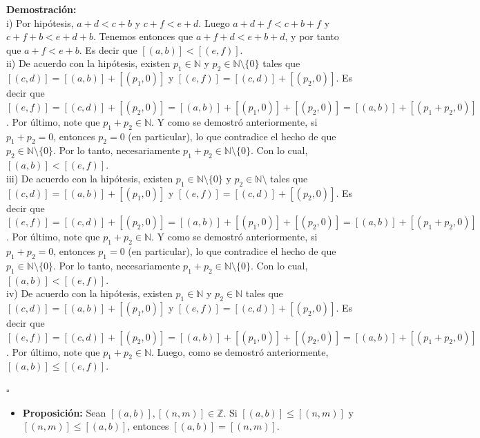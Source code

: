 \documentclass[10 pt]{article}
\begin{document}
\Large{\textbf{Demostración:} \\

i) Por hipótesis, $a+d<c+b$ y $c+f<e+d$. Luego $a+d+f<c+b+f$ y $c+f+b<e+d+b$. Tenemos entonces que $a+f+d<e+b+d$, y por tanto que $a+f<e+b$. Es decir que $[(a,b)]<[(e,f)]$. \\

ii) De acuerdo con la hipótesis, existen $p_1 \in \mathbb N$ y $p_2 \in \mathbb N \setminus \{0\}$ tales que $[(c,d)]=[(a,b)]+[(p_1,0)]$ y $[(e,f)]=[(c,d)]+[(p_2,0)]$. Es decir que $[(e,f)]=[(c,d)]+[(p_2,0)]=[(a,b)]+[(p_1,0)]+[(p_2,0)]=[(a,b)]+[(p_1+p_2,0)]$. Por último, note que $p_1+p_2 \in \mathbb N$. Y como se demostró anteriormente, si $p_1+p_2=0$, entonces $p_2=0$ (en particular), lo que contradice el hecho de que $p_2 \in \mathbb N \setminus \{0\}$. Por lo tanto, necesariamente $p_1+p_2 \in \mathbb N \setminus \{0\}$. Con lo cual, $[(a,b)]<[(e,f)]$. \\

iii) De acuerdo con la hipótesis, existen $p_1 \in \mathbb N \setminus \{0\}$ y $p_2 \in \mathbb N \setminus$ tales que $[(c,d)]=[(a,b)]+[(p_1,0)]$ y $[(e,f)]=[(c,d)]+[(p_2,0)]$. Es decir que $[(e,f)]=[(c,d)]+[(p_2,0)]=[(a,b)]+[(p_1,0)]+[(p_2,0)]=[(a,b)]+[(p_1+p_2,0)]$. Por último, note que $p_1+p_2 \in \mathbb N$. Y como se demostró anteriormente, si $p_1+p_2=0$, entonces $p_1=0$ (en particular), lo que contradice el hecho de que $p_1 \in \mathbb N \setminus \{0\}$. Por lo tanto, necesariamente $p_1+p_2 \in \mathbb N \setminus \{0\}$. Con lo cual, $[(a,b)]<[(e,f)]$. \\

iv) De acuerdo con la hipótesis, existen $p_1 \in \mathbb N$ y $p_2 \in \mathbb N$ tales que $[(c,d)]=[(a,b)]+[(p_1,0)]$ y $[(e,f)]=[(c,d)]+[(p_2,0)]$. Es decir que $[(e,f)]=[(c,d)]+[(p_2,0)]=[(a,b)]+[(p_1,0)]+[(p_2,0)]=[(a,b)]+[(p_1+p_2,0)]$. Por último, note que $p_1+p_2 \in \mathbb N$. Luego, como se demostró anteriormente, $[(a,b)] \leq [(e,f)]$.} \\

\begin{flushright}
    $\square$
\end{flushright}

\begin{itemize}
    \item \Large{\textbf{Proposición:} Sean $[(a,b)],[(n,m)] \in \mathbb Z$. Si $[(a,b)] \leq [(n,m)]$ y $[(n,m)] \leq [(a,b)]$, entonces $[(a,b)]=[(n,m)]$.} \\ 
\end{itemize}
\end{document}
